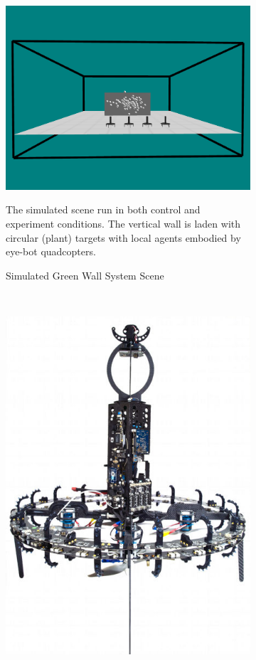 \documentclass{report}
\begin{document}
\begin{figure}
	\begin{subfigure}[b]{0.6\textwidth}
		\centering
		\includegraphics[width=\textwidth]{images/vertical_wall_garden_scene}
		\caption{Simulated Green Wall System Scene}
		\label{fig:sim_orig_scene}
		{The simulated scene run in both control and experiment conditions. The vertical wall is laden with circular (plant) targets with local agents embodied by eye-bot quadcopters}.
	\end{subfigure}
	~
	\begin{subfigure}[b]{0.4\textwidth}
		\centering
		\includegraphics[width=\textwidth]{images/EyebotCarbonFrame}

\end{subfigure}
\end{figure}
\end{document}
